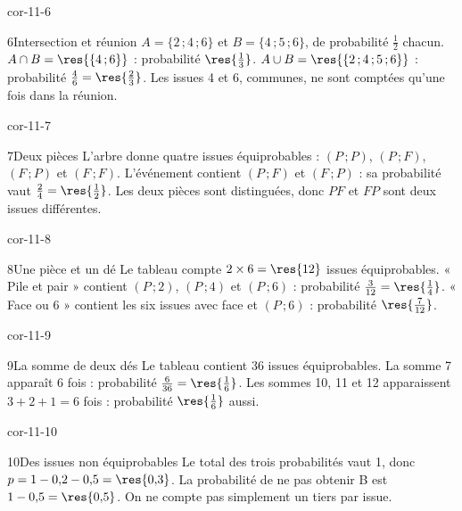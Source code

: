 \begin{blocLivre}{cor-11-6}\begin{corrige}{6}{Intersection et réunion}
$A=\{2\,;4\,;6\}$ et $B=\{4\,;5\,;6\}$, de probabilité $\frac12$ chacun. $A\cap B=\res{\{4\,;6\}}$ : probabilité $\res{\frac13}$. $A\cup B=\res{\{2\,;4\,;5\,;6\}}$ : probabilité $\frac46=\res{\frac23}$. Les issues 4 et 6, communes, ne sont comptées qu’une fois dans la réunion.
\label{fig-cor-11-6}
\end{corrige}\end{blocLivre}
\begin{blocLivre}{cor-11-7}\begin{corrige}{7}{Deux pièces}
L’arbre donne quatre issues équiprobables : $(P\,;P)$, $(P\,;F)$, $(F\,;P)$ et $(F\,;F)$. L’événement contient $(P\,;F)$ et $(F\,;P)$ : sa probabilité vaut $\frac24=\res{\frac12}$. Les deux pièces sont distinguées, donc $PF$ et $FP$ sont deux issues différentes.
\label{fig-cor-11-7}
\end{corrige}\end{blocLivre}
\begin{blocLivre}{cor-11-8}\begin{corrige}{8}{Une pièce et un dé}
Le tableau compte $2\times6=\res{12}$ issues équiprobables. « Pile et pair » contient $(P\,;2)$, $(P\,;4)$ et $(P\,;6)$ : probabilité $\frac3{12}=\res{\frac14}$. « Face ou 6 » contient les six issues avec face et $(P\,;6)$ : probabilité $\res{\frac7{12}}$.
\label{fig-cor-11-8}
\end{corrige}\end{blocLivre}
\begin{blocLivre}{cor-11-9}\begin{corrige}{9}{La somme de deux dés}
Le tableau contient 36 issues équiprobables. La somme 7 apparaît 6 fois : probabilité $\frac6{36}=\res{\frac16}$. Les sommes 10, 11 et 12 apparaissent $3+2+1=6$ fois : probabilité $\res{\frac16}$ aussi.
\label{fig-cor-11-9}
\end{corrige}\end{blocLivre}
\begin{blocLivre}{cor-11-10}\begin{corrige}{10}{Des issues non équiprobables}
Le total des trois probabilités vaut 1, donc $p=1-0{,}2-0{,}5=\res{0{,}3}$. La probabilité de ne pas obtenir B est $1-0{,}5=\res{0{,}5}$. On ne compte pas simplement un tiers par issue.
\end{corrige}\end{blocLivre}
